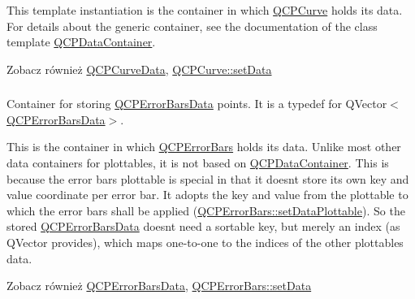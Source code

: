 This template instantiation is the container in which \hyperlink{class_q_c_p_curve}{Q\+C\+P\+Curve} holds its data. For details about the generic container, see the documentation of the class template \hyperlink{class_q_c_p_data_container}{Q\+C\+P\+Data\+Container}.

\begin{DoxySeeAlso}{Zobacz również}
\hyperlink{class_q_c_p_curve_data}{Q\+C\+P\+Curve\+Data}, \hyperlink{class_q_c_p_curve_a41246850d2e080bc57183ca19cd4135e}{Q\+C\+P\+Curve\+::set\+Data} 
\end{DoxySeeAlso}
\subsubsection[{\texorpdfstring{Q\+C\+P\+Error\+Bars\+Data\+Container}{QCPErrorBarsDataContainer}}]{}\hypertarget{qcustomplot_8hh_a8c4472a4da738e0ddbf6b03222c39906}{}\label{qcustomplot_8hh_a8c4472a4da738e0ddbf6b03222c39906}
Container for storing \hyperlink{class_q_c_p_error_bars_data}{Q\+C\+P\+Error\+Bars\+Data} points. It is a typedef for {\ttfamily Q\+Vector$<$\hyperlink{class_q_c_p_error_bars_data}{Q\+C\+P\+Error\+Bars\+Data}$>$}.

This is the container in which \hyperlink{class_q_c_p_error_bars}{Q\+C\+P\+Error\+Bars} holds its data. Unlike most other data containers for plottables, it is not based on \hyperlink{class_q_c_p_data_container}{Q\+C\+P\+Data\+Container}. This is because the error bars plottable is special in that it doesn\textquotesingle{}t store its own key and value coordinate per error bar. It adopts the key and value from the plottable to which the error bars shall be applied (\hyperlink{class_q_c_p_error_bars_aabb42a964cfbf780cd1c79850c7cd989}{Q\+C\+P\+Error\+Bars\+::set\+Data\+Plottable}). So the stored \hyperlink{class_q_c_p_error_bars_data}{Q\+C\+P\+Error\+Bars\+Data} doesn\textquotesingle{}t need a sortable key, but merely an index (as {\ttfamily Q\+Vector} provides), which maps one-\/to-\/one to the indices of the other plottable\textquotesingle{}s data.

\begin{DoxySeeAlso}{Zobacz również}
\hyperlink{class_q_c_p_error_bars_data}{Q\+C\+P\+Error\+Bars\+Data}, \hyperlink{class_q_c_p_error_bars_a92b1980003255f5f7c05407a4d92aabc}{Q\+C\+P\+Error\+Bars\+::set\+Data} 
\end{DoxySeeAlso}
